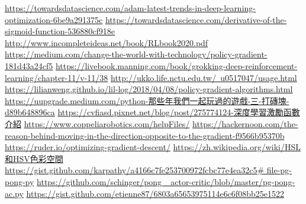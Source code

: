 \newpage
\renewcommand\bibname{參~考~文~獻}
\begin{thebibliography}{99}  %
\href{https://towardsdatascience.com/adam-latest-trends-in-deep-learning-optimization-6be9a291375c}{https://towardsdatascience.com/adam-latest-trends-in-deep-learning-optimization-6be9a291375c}
\href{https://towardsdatascience.com/derivative-of-the-sigmoid-function-536880cf918e}{https://towardsdatascience.com/derivative-of-the-sigmoid-function-536880cf918e}
\href{http://www.incompleteideas.net/book/RLbook2020.pdf}{http://www.incompleteideas.net/book/RLbook2020.pdf}
\href{https://medium.com/change-the-world-with-technology/policy-gradient-181d43a24cf5}{https://medium.com/change-the-world-with-technology/policy-gradient-181d43a24cf5}
\href{https://livebook.manning.com/book/grokking-deep-reinforcement-learning/chapter-11/v-11/38}{https://livebook.manning.com/book/grokking-deep-reinforcement-learning/chapter-11/v-11/38}
\href{http://ukko.life.nctu.edu.tw/~u0517047/usage.html}{http://ukko.life.nctu.edu.tw/~u0517047/usage.html}
\href{https://lilianweng.github.io/lil-log/2018/04/08/policy-gradient-algorithms.html}{https://lilianweng.github.io/lil-log/2018/04/08/policy-gradient-algorithms.html}\label{R.Policy Gradient}
\href{https://uupgrade.medium.com/python-那些年我們一起玩過的遊戲-三-打磚塊-d89b648896ca}{https://uupgrade.medium.com/python-那些年我們一起玩過的遊戲-三-打磚塊-d89b648896ca}
\href{https://cvfiasd.pixnet.net/blog/post/275774124-深度學習激勵函數介紹}{https://cvfiasd.pixnet.net/blog/post/275774124-深度學習激勵函數介紹}
\href{https://www.coppeliarobotics.com/helpFiles/}{https://www.coppeliarobotics.com/helpFiles/}
\href{https://hackernoon.com/the-reason-behind-moving-in-the-direction-opposite-to-the-gradient-f9566b95370b}{https://hackernoon.com/the-reason-behind-moving-in-the-direction-opposite-to-the-gradient-f9566b95370b}\label{OGD}
\href{https://ruder.io/optimizing-gradient-descent/}{https://ruder.io/optimizing-gradient-descent/}
\label{OGD2}
\href{https://reurl.cc/43XjEL}{https://zh.wikipedia.org/wiki/HSL和HSV色彩空間}
\label{RGBtoHSV}
\href{https://reurl.cc/gzMm4N}{https://gist.github.com/karpathy/a4166c7fe253700972fcbc77e4ea32c5\# file-pg-pong-py}\label{R.pong1}
\href{https://reurl.cc/95172Y}{https://github.com/schinger/pong\_ actor-critic/blob/master/pg-pong-ac.py}\label{R.pong1.1}
\href{https://gist.github.com/etienne87/6803a65653975114e6c6f08bb25e1522}{https://gist.github.com/etienne87/6803a65653975114e6c6f08bb25e1522}\label{R.pong2}
%
\end{thebibliography}
\newpage